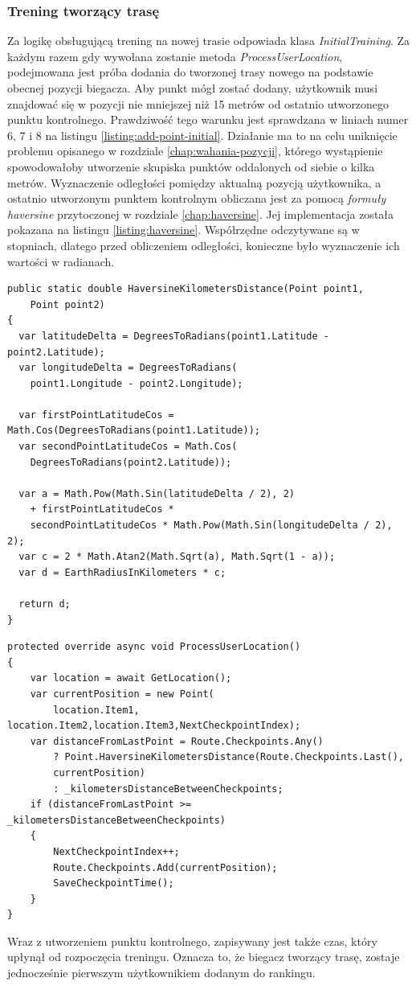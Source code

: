 \subsubsection{Trening tworzący trasę}
Za logikę obsługującą trening na nowej trasie odpowiada klasa \textit{InitialTraining}. Za każdym razem gdy wywołana zostanie metoda \textit{ProcessUserLocation}, podejmowana jest próba dodania do tworzonej trasy nowego na podstawie obecnej pozycji biegacza. Aby punkt mógł zostać dodany, użytkownik musi znajdować się w pozycji nie mniejszej niż 15 metrów od ostatnio utworzonego punktu kontrolnego. Prawdziwość tego warunku jest sprawdzana w liniach numer 6, 7 i 8 na listingu \ref{listing:add-point-initial}. Działanie ma to na celu uniknięcie problemu opisanego w rozdziale \ref{chap:wahania-pozycji}, którego wystąpienie spowodowałoby utworzenie skupiska punktów oddalonych od siebie o kilka metrów. Wyznaczenie odległości pomiędzy aktualną pozycją użytkownika, a ostatnio utworzonym punktem kontrolnym obliczana jest za pomocą \textit{formuły haversine} przytoczonej w rozdziale \ref{chap:haversine}. Jej implementacja została pokazana na listingu \ref{listing:haversine}. Współrzędne odczytywane są w stopniach, dlatego przed obliczeniem odległości, konieczne było wyznaczenie ich wartości w radianach.
\begin{lstlisting}[caption={Wyznaczenie odległości pomiędzy dwoma punktami},label=listing:haversine]
public static double HaversineKilometersDistance(Point point1,
	Point point2)
{
  var latitudeDelta = DegreesToRadians(point1.Latitude - point2.Latitude);
  var longitudeDelta = DegreesToRadians(
  	point1.Longitude - point2.Longitude);

  var firstPointLatitudeCos = Math.Cos(DegreesToRadians(point1.Latitude));
  var secondPointLatitudeCos = Math.Cos(
  	DegreesToRadians(point2.Latitude));

  var a = Math.Pow(Math.Sin(latitudeDelta / 2), 2)
  	+ firstPointLatitudeCos *
	secondPointLatitudeCos * Math.Pow(Math.Sin(longitudeDelta / 2), 2);
  var c = 2 * Math.Atan2(Math.Sqrt(a), Math.Sqrt(1 - a));
  var d = EarthRadiusInKilometers * c;

  return d;
}
\end{lstlisting}

\begin{lstlisting}[caption={Tworzenie punktów kontrolnych},label=listing:add-point-initial]
protected override async void ProcessUserLocation()
{
    var location = await GetLocation();
    var currentPosition = new Point(
    	location.Item1, location.Item2,location.Item3,NextCheckpointIndex);
    var distanceFromLastPoint = Route.Checkpoints.Any()
        ? Point.HaversineKilometersDistance(Route.Checkpoints.Last(),
        currentPosition)
        : _kilometersDistanceBetweenCheckpoints;
    if (distanceFromLastPoint >= _kilometersDistanceBetweenCheckpoints)
    {
        NextCheckpointIndex++;
        Route.Checkpoints.Add(currentPosition);
        SaveCheckpointTime();
    }
}
\end{lstlisting}
Wraz z utworzeniem punktu kontrolnego, zapisywany jest także czas, który upłynął od rozpoczęcia treningu. Oznacza to, że biegacz tworzący trasę, zostaje jednocześnie pierwszym użytkownikiem dodanym do rankingu.

